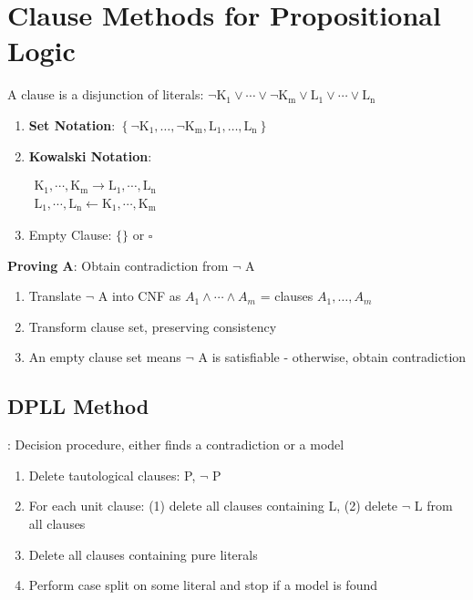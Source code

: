 \documentclass{article}
\begin{document}
\section{Clause Methods for Propositional Logic}
A clause is a disjunction of literals: $\neg \mathrm{K}_{1} \vee \cdots \vee \neg \mathrm{K}_{\mathrm{m}} \vee \mathrm{L}_{1} \vee \cdots \vee \mathrm{L}_{\mathrm{n}}$
\begin{enumerate}
    \item \textbf{Set Notation}: $\left\{\neg \mathrm{K}_{1}, \ldots, \neg \mathrm{K}_{\mathrm{m}}, \mathrm{L}_{1}, \ldots, \mathrm{L}_{\mathrm{n}}\right\}$
    
    \item \textbf{Kowalski Notation}: 
    
    $\begin{array}{l}{\mathrm{K}_{1}, \cdots, \mathrm{K}_{\mathrm{m}} \rightarrow \mathrm{L}_{1}, \cdots, \mathrm{L}_{\mathrm{n}}} \\ {\mathrm{L}_{1}, \cdots, \mathrm{L}_{\mathrm{n}} \leftarrow \mathrm{K}_{1}, \cdots, \mathrm{K}_{\mathrm{m}}}\end{array}$
    
    \item Empty Clause: $\{ \}$ or $\square$
\end{enumerate}

\noindent
\textbf{Proving A}: Obtain contradiction from $\neg$ A
\begin{enumerate}
    \item Translate $\neg$ A into CNF as $A_{1} \wedge \cdots \wedge A_{m}$ = clauses $A_{1}, \dots, A_{m}$
    \item Transform clause set, preserving consistency
    \item An empty clause set means $\neg$ A is satisfiable - otherwise, obtain contradiction
\end{enumerate}

\subsection{DPLL Method}: Decision procedure, either finds a contradiction or a model
\begin{enumerate}
    \item Delete tautological clauses: {P, $\neg$ P}
    \item For each unit clause: (1) delete all clauses containing L, (2) delete $\neg$ L from all clauses
    \item Delete all clauses containing pure literals
    \item Perform case split on some literal and stop if a model is found
\end{enumerate}
\end{document}
